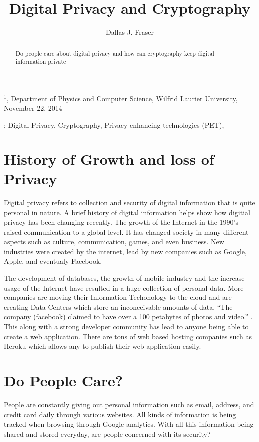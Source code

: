 \documentclass[12pt]{article}
\title{Digital Privacy and Cryptography}
\author{
	Dallas J. Fraser\inst{1}
}
\def\inst#1{$^{#1}$}
\begin{document}
\maketitle

\begin{center}
{\footnotesize

\inst{1}, Department of Physics and Computer Science, Wilfrid Laurier 
University, November 22, 2014}

\end{center}

\begin{abstract}
Do people care about digital privacy and how can cryptography keep digital information private
\end{abstract}

: Digital Privacy, Cryptography, Privacy enhancing technologies (PET),

\clearpage

\section{History of Growth and loss of Privacy}\label{sec:history}


Digital privacy refers to collection and security of digital information that is quite personal in nature. A brief history of digital information helps show how digitial privacy has been changing recently. The growth of the Internet in the 1990's raised communication to a global level. It has changed society in many different aspects such as culture, communication, games, and even business. New industries were created by the internet, lead by new companies such as Google, Apple, and eventualy Facebook.

The development of databases, the growth of mobile industry  and the increase usage of the Internet have resulted in a huge collection of personal data. More companies are moving their Information Techonology to the cloud and are creating Data Centers which store an inconceivable amounts of data. ``The company (facebook) claimed to have over a 100 petabytes of photos and video.'' \cite{Wallbank}. This along with a strong developer community has lead to anyone being able to create a web application. There are tons of web based hosting companies such as Heroku which allows any to publish their web application easily.

\section{Do People Care?}\label{sec:demand}
People are constantly giving out personal information such as email, address, and credit card daily through various websites. All kinds of information is being tracked when browsing through Google analytics. With all this information being shared and stored everyday, are people concerned with its security?
\end{document}
